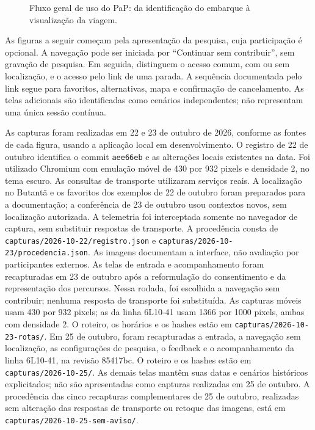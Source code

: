 \documentclass[12pt,oneside,a4paper,brazil,chapter=TITLE]{abntex2}
\begin{document}
\begin{figure}[H]
\centering

\caption{Fluxo geral de uso do PaP: da identificação do embarque à visualização da viagem.}\label{fig:fluxo-pap}
\end{figure}

\clearpage
As figuras a seguir começam pela apresentação da pesquisa, cuja participação é opcional. A navegação pode ser iniciada por ``Continuar sem contribuir'', sem gravação de pesquisa. Em seguida, distinguem o acesso comum, com ou sem localização, e o acesso pelo link de uma parada. A sequência documentada pelo link segue para favoritos, alternativas, mapa e confirmação de cancelamento. As telas adicionais são identificadas como cenários independentes; não representam uma única sessão contínua.

As capturas foram realizadas em 22 e 23 de outubro de 2026, conforme as fontes de cada figura, usando a aplicação local em desenvolvimento. O registro de 22 de outubro identifica o commit \texttt{aee66eb} e as alterações locais existentes na data. Foi utilizado Chromium com emulação móvel de 430 por 932 pixels e densidade 2, no tema escuro. As consultas de transporte utilizaram serviços reais. A localização no Butantã e os favoritos dos exemplos de 22 de outubro foram preparados para a documentação; a conferência de 23 de outubro usou contextos novos, sem localização autorizada. A telemetria foi interceptada somente no navegador de captura, sem substituir respostas de transporte. A procedência consta de \nolinkurl{capturas/2026-10-22/registro.json} e \nolinkurl{capturas/2026-10-23/procedencia.json}. As imagens documentam a interface, não avaliação por participantes externos. As telas de entrada e acompanhamento foram recapturadas em 23 de outubro após a reformulação do consentimento e da representação dos percursos. Nessa rodada, foi escolhida a navegação sem contribuir; nenhuma resposta de transporte foi substituída. As capturas móveis usam 430 por 932 pixels; as da linha 6L10-41 usam 1366 por 1000 pixels, ambas com densidade 2. O roteiro, os horários e os hashes estão em \nolinkurl{capturas/2026-10-23-rotas/}. Em 25 de outubro, foram recapturadas a entrada, a navegação sem localização, as configurações de pesquisa, o feedback e o acompanhamento da linha 6L10-41, na revisão 85417bc. O roteiro e os hashes estão em \nolinkurl{capturas/2026-10-25/}. As demais telas mantêm suas datas e cenários históricos explicitados; não são apresentadas como capturas realizadas em 25 de outubro. A procedência das cinco recapturas complementares de 25 de outubro, realizadas sem alteração das respostas de transporte ou retoque das imagens, está em \nolinkurl{capturas/2026-10-25-sem-aviso/}.
\end{document}
